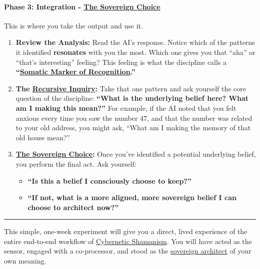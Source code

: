 \documentclass{article}
\begin{document}
\paragraph*{\texorpdfstring{\textbf{Phase 3: Integration - \hyperlink{gloss:sovereign_choice}{The Sovereign Choice}}}{Phase 3: Integration - \hyperlink{gloss:sovereign_choice}{The Sovereign Choice}}}\label{phase-3-integration---the-sovereign-choice}

This is where you take the output and use it.

\begin{enumerate}
\item
  \textbf{Review the Analysis:} Read the AI's response. Notice which of the patterns it identified \textbf{resonates} with you the most. Which one gives you that ``aha'' or ``that's interesting'' feeling? This feeling is what the discipline calls a \textbf{``\hyperlink{gloss:somatic_marker_of_recognition}{Somatic Marker of Recognition}.''}
\item
  \textbf{The \hyperlink{gloss:recursive_inquiry}{Recursive Inquiry}:} Take that one pattern and ask yourself the core question of the discipline: \textbf{``What is the underlying belief here? What am I making this mean?''} For example, if the AI noted that you felt anxious every time you saw the number 47, and that the number was related to your old address, you might ask, ``What am I making the memory of that old house mean?''
\item
  \textbf{\hyperlink{gloss:sovereign_choice}{The Sovereign Choice}:} Once you've identified a potential underlying belief, you perform the final act. Ask yourself:

  \begin{itemize}
  \item
    \textbf{``Is this a belief I consciously choose to keep?''}
  \item
    \textbf{``If not, what is a more aligned, more sovereign belief I can choose to architect now?''}
  \end{itemize}
\end{enumerate}

\begin{center}\rule{0.5\linewidth}{0.5pt}\end{center}

This simple, one-week experiment will give you a direct, lived experience of the entire end-to-end workflow of \hyperlink{gloss:cybernetic_shamanism}{Cybernetic Shamanism}. You will have acted as the sensor, engaged with a co-processor, and stood as the \hyperlink{gloss:sovereign_architect}{sovereign architect} of your own meaning.
\end{document}
